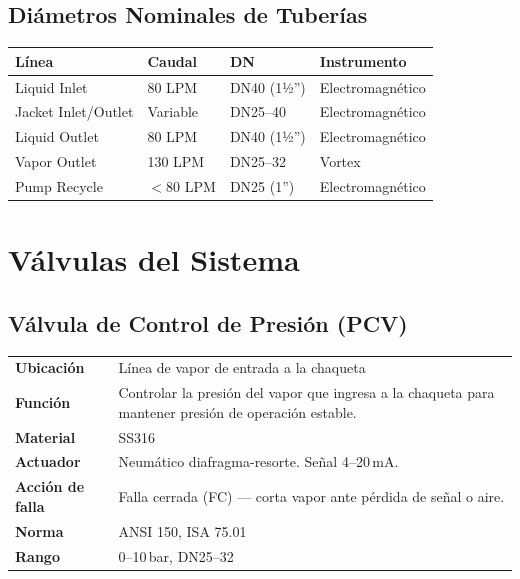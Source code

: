 \documentclass[12pt,letterpaper]{article}
\begin{document}
\subsection{Diámetros Nominales de Tuberías}

\renewcommand{\arraystretch}{1.3}
\begin{tabular}{L{4cm} C{2.5cm} C{2.5cm} L{4.5cm}}
\toprule
{}
\color{white}\textbf{Línea} & \color{white}\textbf{Caudal} & \color{white}\textbf{DN} & \color{white}\textbf{Instrumento} \\
\midrule
Liquid Inlet   & 80 LPM       & DN40 (1½'') & Electromagnético \\
Jacket Inlet/Outlet & Variable & DN25--40    & Electromagnético \\
Liquid Outlet  & 80 LPM       & DN40 (1½'') & Electromagnético \\
Vapor Outlet   & 130 LPM      & DN25--32    & Vortex \\
Pump Recycle   & $<$80 LPM    & DN25 (1'')  & Electromagnético \\
\bottomrule
\end{tabular}

\section{Válvulas del Sistema}

\subsection{Válvula de Control de Presión (PCV)}

\begin{especbox}[title={PCV — Fisher EZ Globe Valve + Actuador 657}]
\renewcommand{\arraystretch}{1.25}
\begin{tabular}{L{4cm} L{9.5cm}}
\textbf{Ubicación}       & Línea de vapor de entrada a la chaqueta \\
\textbf{Función}         & Controlar la presión del vapor que ingresa a la chaqueta para mantener presión de operación estable. \\
\textbf{Material}        & SS316 \\
\textbf{Actuador}        & Neumático diafragma-resorte. Señal 4--20\,mA. \\
\textbf{Acción de falla} & Falla cerrada (FC) — corta vapor ante pérdida de señal o aire. \\
\textbf{Norma}           & ANSI 150, ISA 75.01 \\
\textbf{Rango}           & 0--10\,bar, DN25--32 \\
\end{tabular}
\end{especbox}
\end{document}
